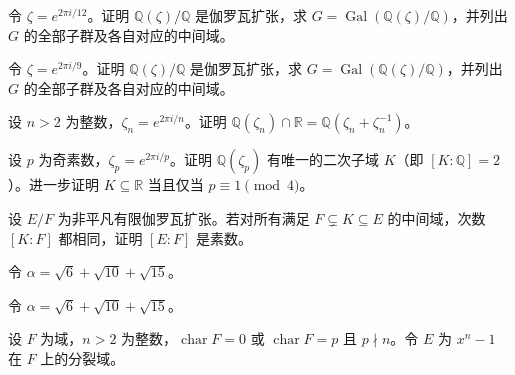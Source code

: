 \noindent\begin{minipage}{\textwidth}
令 $\zeta=e^{2\pi i/12}$。证明 $\mathbb Q(\zeta)/\mathbb Q$ 是伽罗瓦扩张，求 $G=\operatorname{Gal}(\mathbb Q(\zeta)/\mathbb Q)$，并列出 $G$ 的全部子群及各自对应的中间域。
\end{minipage}\par\vfill
\noindent\begin{minipage}{\textwidth}
令 $\zeta=e^{2\pi i/9}$。证明 $\mathbb Q(\zeta)/\mathbb Q$ 是伽罗瓦扩张，求 $G=\operatorname{Gal}(\mathbb Q(\zeta)/\mathbb Q)$，并列出 $G$ 的全部子群及各自对应的中间域。
\end{minipage}\par\vfill
\newpage
\noindent\begin{minipage}{\textwidth}
设 $n>2$ 为整数，$\zeta_n=e^{2\pi i/n}$。证明 $\mathbb Q(\zeta_n)\cap\mathbb R=\mathbb Q(\zeta_n+\zeta_n^{-1})$。
\end{minipage}\par\vfill
\noindent\begin{minipage}{\textwidth}
设 $p$ 为奇素数，$\zeta_p=e^{2\pi i/p}$。证明 $\mathbb Q(\zeta_p)$ 有唯一的二次子域 $K$（即 $[K:\mathbb Q]=2$）。进一步证明 $K\subseteq\mathbb R$ 当且仅当 $p\equiv1\pmod4$。
\end{minipage}\par\vfill
\noindent\begin{minipage}{\textwidth}
设 $E/F$ 为非平凡有限伽罗瓦扩张。若对所有满足 $F\subsetneq K\subseteq E$ 的中间域，次数 $[K:F]$ 都相同，证明 $[E:F]$ 是素数。
\end{minipage}\par\vfill
\newpage
\noindent\begin{minipage}{\textwidth}
令 $\alpha=\sqrt6+\sqrt{10}+\sqrt{15}$。
\end{minipage}\par\vfill
\noindent\begin{minipage}{\textwidth}
令 $\alpha=\sqrt6+\sqrt{10}+\sqrt{15}$。
\end{minipage}\par\vfill
\noindent\begin{minipage}{\textwidth}
设 $F$ 为域，$n>2$ 为整数，$\operatorname{char}F=0$ 或 $\operatorname{char}F=p$ 且 $p\nmid n$。令 $E$ 为 $x^n-1$ 在 $F$ 上的分裂域。
\end{minipage}\par\vfill
